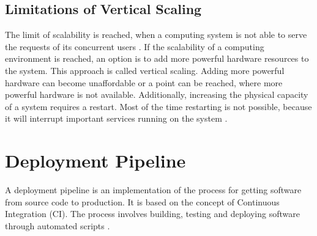 \subsection{Limitations of Vertical Scaling}
\label{subsec:02_foundations_scalability_limits}
The limit of scalability is reached, when a computing system is not able to serve the requests of its concurrent users \cite{Wilder2012CloudPatterns}.
If the scalability of a computing environment is reached, an option is to add more powerful hardware resources to the system. This approach is called vertical scaling. Adding more powerful hardware can become unaffordable or a point can be reached, where more powerful hardware is not available.
Additionally, increasing the physical capacity of a system requires a restart. Most of the time restarting is not possible, because it will interrupt important services running on the system \cite{Wilder2012CloudPatterns}.


\section{Deployment Pipeline}
A deployment pipeline is an implementation of the process for getting software from source code to production.
It is based on the concept of Continuous Integration (CI).
The process involves building, testing and deploying software through automated scripts \cite{Farley2010CI}.



